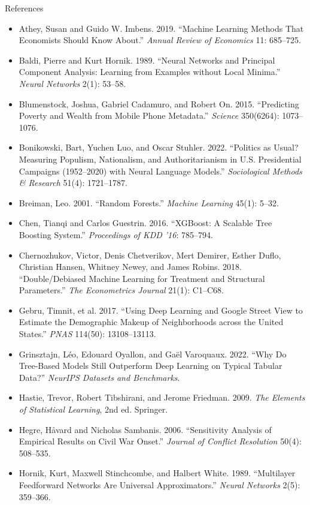 \documentclass[aspectratio=169,11pt,xcolor=dvipsnames]{beamer}
\begin{document}
\begin{frame}[allowframebreaks,t]{References}
\footnotesize
\begin{itemize}\itemsep2pt
\item Athey, Susan and Guido W. Imbens. 2019. ``Machine Learning Methods That Economists Should Know About.'' \textit{Annual Review of Economics} 11: 685--725.
\item Baldi, Pierre and Kurt Hornik. 1989. ``Neural Networks and Principal Component Analysis: Learning from Examples without Local Minima.'' \textit{Neural Networks} 2(1): 53--58.
\item Blumenstock, Joshua, Gabriel Cadamuro, and Robert On. 2015. ``Predicting Poverty and Wealth from Mobile Phone Metadata.'' \textit{Science} 350(6264): 1073--1076.
\item Bonikowski, Bart, Yuchen Luo, and Oscar Stuhler. 2022. ``Politics as Usual? Measuring Populism, Nationalism, and Authoritarianism in U.S. Presidential Campaigns (1952--2020) with Neural Language Models.'' \textit{Sociological Methods \& Research} 51(4): 1721--1787.
\item Breiman, Leo. 2001. ``Random Forests.'' \textit{Machine Learning} 45(1): 5--32.
\item Chen, Tianqi and Carlos Guestrin. 2016. ``XGBoost: A Scalable Tree Boosting System.'' \textit{Proceedings of KDD '16}: 785--794.
\item Chernozhukov, Victor, Denis Chetverikov, Mert Demirer, Esther Duflo, Christian Hansen, Whitney Newey, and James Robins. 2018. ``Double/Debiased Machine Learning for Treatment and Structural Parameters.'' \textit{The Econometrics Journal} 21(1): C1--C68.
\item Gebru, Timnit, et al. 2017. ``Using Deep Learning and Google Street View to Estimate the Demographic Makeup of Neighborhoods across the United States.'' \textit{PNAS} 114(50): 13108--13113.
\item Grinsztajn, Léo, Edouard Oyallon, and Gaël Varoquaux. 2022. ``Why Do Tree-Based Models Still Outperform Deep Learning on Typical Tabular Data?'' \textit{NeurIPS Datasets and Benchmarks}.
\item Hastie, Trevor, Robert Tibshirani, and Jerome Friedman. 2009. \textit{The Elements of Statistical Learning}, 2nd ed. Springer.
\item Hegre, H{\aa}vard and Nicholas Sambanis. 2006. ``Sensitivity Analysis of Empirical Results on Civil War Onset.'' \textit{Journal of Conflict Resolution} 50(4): 508--535.
\item Hornik, Kurt, Maxwell Stinchcombe, and Halbert White. 1989. ``Multilayer Feedforward Networks Are Universal Approximators.'' \textit{Neural Networks} 2(5): 359--366.

\end{itemize}
\end{frame}
\end{document}
